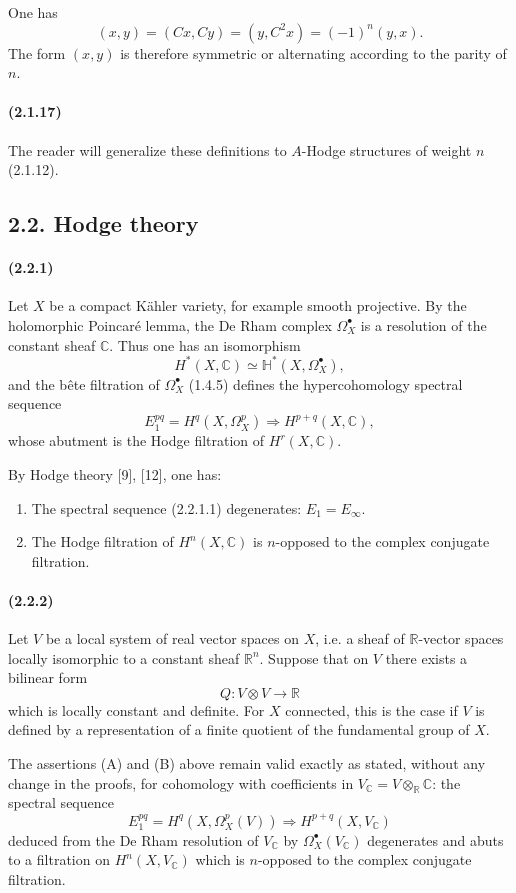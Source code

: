 \documentclass[10pt]{article}
\newcommand{\C}{\mathbb C}
\newcommand{\R}{\mathbb R}
\begin{document}
One has
\[
(x,y)=(Cx,Cy)=(y,C^2x)=(-1)^n(y,x).
\]
The form $(x,y)$ is therefore symmetric or alternating according to the parity of $n$.

\paragraph{(2.1.17)} The reader will generalize these definitions to $A$-Hodge structures of weight $n$ (2.1.12).

\subsection*{2.2. Hodge theory}

\paragraph{(2.2.1)} Let $X$ be a compact Kähler variety, for example smooth projective. By the holomorphic Poincaré lemma, the De Rham complex $\Omega_X^\bullet$ is a resolution of the constant sheaf $\C$. Thus one has an isomorphism
\[
H^*(X,\C)\simeq\mathbb H^*(X,\Omega_X^\bullet),
\]
and the bête filtration of $\Omega_X^\bullet$ (1.4.5) defines the hypercohomology spectral sequence
\[
\tag{2.2.1.1}
E_1^{pq}=H^q(X,\Omega_X^p)\Longrightarrow H^{p+q}(X,\C),
\]
whose abutment is the Hodge filtration of $H^r(X,\C)$.

By Hodge theory [9], [12], one has:
\begin{enumerate}[label=(\Alph*)]
\item The spectral sequence (2.2.1.1) degenerates: $E_1=E_\infty$.
\item The Hodge filtration of $H^n(X,\C)$ is $n$-opposed to the complex conjugate filtration.
\end{enumerate}

\paragraph{(2.2.2)} Let $V$ be a local system of real vector spaces on $X$, i.e. a sheaf of $\R$-vector spaces locally isomorphic to a constant sheaf $\R^n$. Suppose that on $V$ there exists a bilinear form
\[
Q:V\otimes V\longrightarrow\R
\]
which is locally constant and definite. For $X$ connected, this is the case if $V$ is defined by a representation of a finite quotient of the fundamental group of $X$.

The assertions (A) and (B) above remain valid exactly as stated, without any change in the proofs, for cohomology with coefficients in $V_\C=V\otimes_\R\C$: the spectral sequence
\[
E_1^{pq}=H^q(X,\Omega_X^p(V))\Longrightarrow H^{p+q}(X,V_\C)
\]
deduced from the De Rham resolution of $V_\C$ by $\Omega_X^\bullet(V_\C)$ degenerates and abuts to a filtration on $H^n(X,V_\C)$ which is $n$-opposed to the complex conjugate filtration.
\end{document}
